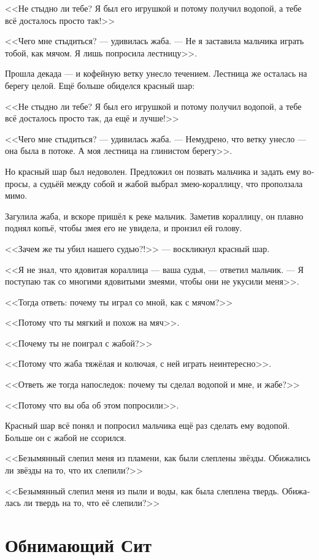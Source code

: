 \documentclass[a4paper,12pt,fleqn]{book}\usepackage{cooltooltips}\usepackage{polyglossia}\setdefaultlanguage[babelshorthands=true]{russian}\setotherlanguage{english}\defaultfontfeatures{Ligatures=TeX,Mapping=tex-text} \usepackage{xcolor}\definecolor{lightgray}{HTML}{bbbbbb}\color{lightgray}\newcommand{\ml}[3]{\textenglish{\textcolor{black}{#3}}}
\newcommand{\textspace}{\vspace{1em}{\centering\Large\bfseries<...>\par}\vspace{1em}}
\begin{document}
{<<Не стыдно ли тебе?
Я был его игрушкой и потому получил водопой, а тебе всё досталось просто так!>>

<<Чего мне стыдиться? --- удивилась жаба.
--- Не я заставила мальчика играть тобой, как мячом.
Я лишь попросила лестницу>>.

Прошла декада --- и кофейную ветку унесло течением.
Лестница же осталась на берегу целой.
Ещё больше обиделся красный шар:

<<Не стыдно ли тебе?
Я был его игрушкой и потому получил водопой, а тебе всё досталось просто так, да ещё и лучше!>>

<<Чего мне стыдиться? --- удивилась жаба.
--- Немудрено, что ветку унесло --- она была в потоке.
А моя лестница на глинистом берегу>>.

Но красный шар был недоволен.
Предложил он позвать мальчика и задать ему вопросы, а судьёй между собой и жабой выбрал змею-кораллицу, что проползала мимо.

Загулила жаба, и вскоре пришёл к реке мальчик.
Заметив кораллицу, он плавно поднял копьё, чтобы змея его не увидела, и пронзил ей голову.

<<Зачем же ты убил нашего судью?!>> --- воскликнул красный шар.

<<Я не знал, что ядовитая кораллица --- ваша судья, --- ответил мальчик.
--- Я поступаю так со многими ядовитыми змеями, чтобы они не укусили меня>>.

<<Тогда ответь: почему ты играл со мной, как с мячом?>>

<<Потому что ты мягкий и похож на мяч>>.

<<Почему ты не поиграл с жабой?>>

<<Потому что жаба тяжёлая и колючая, с ней играть неинтересно>>.

<<Ответь же тогда напоследок: почему ты сделал водопой и мне, и жабе?>>

<<Потому что вы оба об этом попросили>>.

Красный шар всё понял и попросил мальчика ещё раз сделать ему водопой.
Больше он с жабой не ссорился.

\textspace

<<Безымянный слепил меня из пламени, как были слеплены звёзды.
Обижались ли звёзды на то, что их слепили?>>

<<Безымянный слепил меня из пыли и воды, как была слеплена твердь.
Обижалась ли твердь на то, что её слепили?>>

\section{Обнимающий Сит}

}
\end{document}
